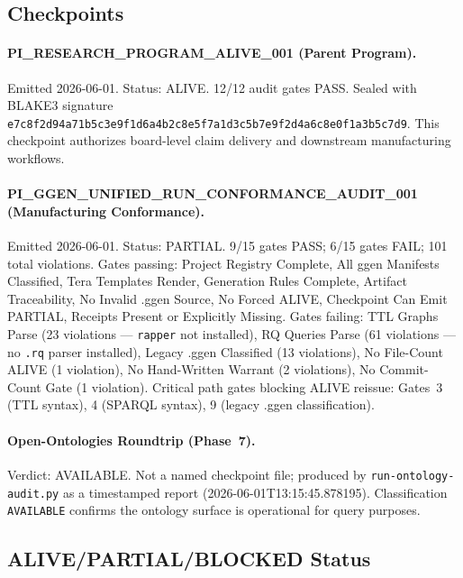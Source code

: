 \subsection{Checkpoints}
\label{sec:research-open-ontologies-checkpoints}

\paragraph{PI\_RESEARCH\_PROGRAM\_ALIVE\_001 (Parent Program).}
Emitted 2026-06-01. Status: ALIVE. 12/12 audit gates PASS. Sealed with BLAKE3 signature
\texttt{e7c8f2d94a71b5c3e9f1d6a4b2c8e5f7a1d3c5b7e9f2d4a6c8e0f1a3b5c7d9}.
This checkpoint authorizes board-level claim delivery and downstream manufacturing workflows.

\paragraph{PI\_GGEN\_UNIFIED\_RUN\_CONFORMANCE\_AUDIT\_001 (Manufacturing Conformance).}
Emitted 2026-06-01. Status: PARTIAL. 9/15 gates PASS; 6/15 gates FAIL; 101 total violations.
Gates passing: Project Registry Complete, All ggen Manifests Classified, Tera Templates Render,
Generation Rules Complete, Artifact Traceability, No Invalid .ggen Source, No Forced ALIVE,
Checkpoint Can Emit PARTIAL, Receipts Present or Explicitly Missing.
Gates failing: TTL Graphs Parse (23 violations --- \texttt{rapper} not installed),
RQ Queries Parse (61 violations --- no \texttt{.rq} parser installed), Legacy .ggen
Classified (13 violations), No File-Count ALIVE (1 violation), No Hand-Written Warrant
(2 violations), No Commit-Count Gate (1 violation).
Critical path gates blocking ALIVE reissue: Gates~3 (TTL syntax), 4 (SPARQL syntax), 9
(legacy .ggen classification).

\paragraph{Open-Ontologies Roundtrip (Phase~7).}
Verdict: AVAILABLE. Not a named checkpoint file; produced by \texttt{run-ontology-audit.py}
as a timestamped report (2026-06-01T13:15:45.878195). Classification \texttt{AVAILABLE}
confirms the ontology surface is operational for query purposes.

\subsection{ALIVE/PARTIAL/BLOCKED Status}
\label{sec:research-open-ontologies-status}

